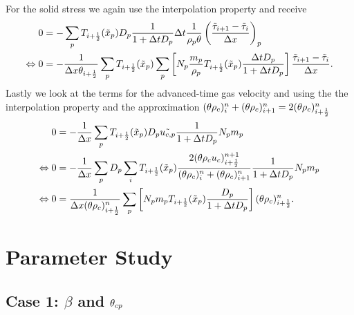 For the solid stress we again use the interpolation property and receive
\begin{align*}
    0 &= - \sum_p T_{i+\frac{1}{2}} (\tilde{x}_p) D_p \dfrac{1}{1+ \Delta t D_p} \Delta t \dfrac{1}{\rho_p \theta} \left( \dfrac{\tilde{\tau}_{i+1} - \tilde{\tau}_{i}}{\Delta x} \right)_p \\
    \Leftrightarrow
    0 &= - \dfrac{1}{\Delta x \theta_{i+\frac{1}{2}}} \sum_{p} T_{i+\frac{1}{2}} (\tilde{x}_p) \sum_p \left[ N_p \dfrac{m_p}{\rho_p} T_{i+\frac{1}{2}} (\tilde{x}_p) \dfrac{\Delta t D_p}{1 + \Delta t D_p}  \right] \dfrac{\tilde{\tau}_{i+1} - \tilde{\tau}_{i}}{\Delta x}.
\end{align*}
Lastly we look at the terms for the advanced-time gas velocity and using the the interpolation property and the approximation $(\theta \rho_c)_i^n + (\theta \rho_c)_{i+1}^n = 2 (\theta \rho_c)_{i+\frac{1}{2}}^n$
\begin{align*}
    0 &= - \dfrac{1}{\Delta x} \sum_p T_{i+\frac{1}{2}} ( \tilde{x}_p ) D_p \tilde{u_{c,p}} \dfrac{1}{1+\Delta t D_p} N_p m_p  \\
    \Leftrightarrow 0 &= - \dfrac{1}{\Delta x} \sum_p D_p 
    \sum_i T_{i+\frac{1}{2}} (\tilde{x}_p) \dfrac{2 (\theta \rho_c u_c)_{i+\frac{1}{2}}^{n+1}}{(\theta \rho_c)_i^n + (\theta \rho_c)_{i+1}^n} \dfrac{1}{1+\Delta t D_p} N_p m_p \\
    \Leftrightarrow 0 &= 
    \dfrac{1}{\Delta x (\theta \rho_c)_{i+\frac{1}{2}}^n} \sum_p \left[ N_p m_p T_{i+\frac{1}{2}} (\tilde{x}_p) \frac{D_p}{1+ \Delta t D_p}\right] (\theta \rho_c)_{i+\frac{1}{2}}^n.
\end{align*}



\small
\section{Parameter Study}
\label{sec:AppParamStud}


\subsection{Case 1: $\beta$ and $\theta_{cp}$}
\label{App:Case1}

